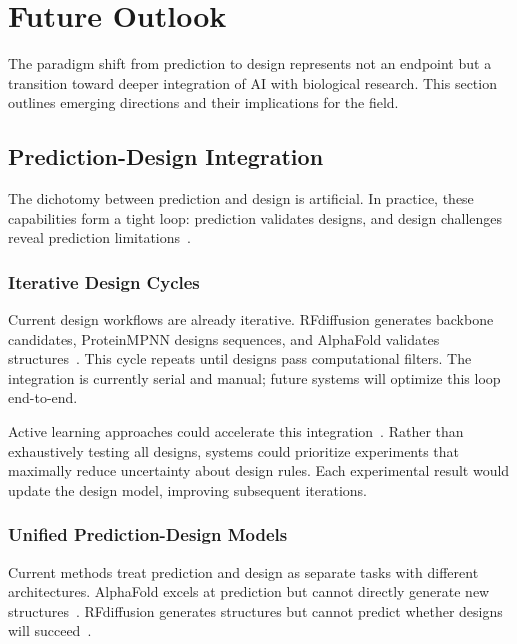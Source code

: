 
\section{Future Outlook}
\label{sec:future}

The paradigm shift from prediction to design represents not an endpoint but a transition toward deeper integration of AI with biological research. This section outlines emerging directions and their implications for the field.

\subsection{Prediction-Design Integration}
\label{subsec:integration}

The dichotomy between prediction and design is artificial. In practice, these capabilities form a tight loop: prediction validates designs, and design challenges reveal prediction limitations~\cite{watson2023rfdiffusion}.

\subsubsection{Iterative Design Cycles}

Current design workflows are already iterative. RFdiffusion generates backbone candidates, ProteinMPNN designs sequences, and AlphaFold validates structures~\cite{dauparas2022proteinmpnn}. This cycle repeats until designs pass computational filters. The integration is currently serial and manual; future systems will optimize this loop end-to-end.

Active learning approaches could accelerate this integration~\cite{dallago2024plmfinetune}. Rather than exhaustively testing all designs, systems could prioritize experiments that maximally reduce uncertainty about design rules. Each experimental result would update the design model, improving subsequent iterations.

\subsubsection{Unified Prediction-Design Models}

Current methods treat prediction and design as separate tasks with different architectures. AlphaFold excels at prediction but cannot directly generate new structures~\cite{abramson2024alphafold3}. RFdiffusion generates structures but cannot predict whether designs will succeed~\cite{watson2023rfdiffusion}.

